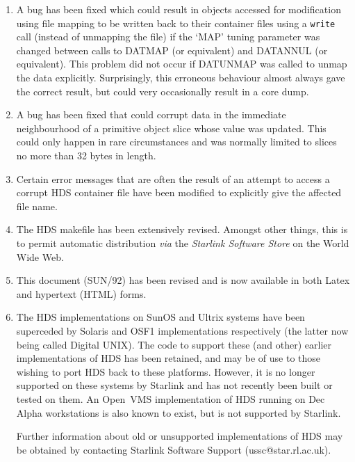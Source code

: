 \documentclass[twoside,11pt]{article}
\newcommand{\htmlref}[2]{#1}
\renewcommand{\_}{\texttt{\symbol{95}}}
\newcommand{\hi}[1]{{\tt{#1}}}
\newcommand{\st}[1]{{\em{#1}}}
\begin{document}
\begin{enumerate}
\item A bug has been fixed which could result in objects accessed for
modification using file mapping to be written back to their container
files using a \hi{write} call (instead of unmapping the file) if the
`MAP' tuning parameter was changed between calls to
\htmlref{DAT\_MAP}{DAT_MAP} (or equivalent) and
\htmlref{DAT\_ANNUL}{DAT_ANNUL} (or equivalent). This problem did not
occur if \htmlref{DAT\_UNMAP}{DAT_UNMAP} was called to unmap the data
explicitly. Surprisingly, this erroneous behaviour almost always gave
the correct result, but could very occasionally result in a core dump.

\item A bug has been fixed that could corrupt data in the immediate
neighbourhood of a primitive object slice whose value was
updated. This could only happen in rare circumstances and was normally
limited to slices no more than 32 bytes in length.

\item Certain error messages that are often the result of an attempt
to access a corrupt HDS container file have been modified to
explicitly give the affected file name.

\item The HDS makefile has been extensively revised. Amongst other
things, this is to permit automatic distribution \st{via} the
\st{Starlink Software Store} on the World Wide Web.

\item This document (SUN/92) has been revised and is now available in
both Latex and hypertext (HTML) forms.

\item The HDS implementations on SunOS and Ultrix systems have been
superceded by Solaris and OSF1 implementations respectively (the
latter now being called Digital UNIX). The code to support these (and
other) earlier implementations of HDS has been retained, and may be of
use to those wishing to port HDS back to these platforms. However, it
is no longer supported on these systems by Starlink and has not
recently been built or tested on them.  An Open~VMS implementation of
HDS running on Dec Alpha workstations is also known to exist, but is
not supported by Starlink.

Further information about old or unsupported implementations of HDS
may be obtained by contacting Starlink Software Support
(ussc@star.rl.ac.uk).

\end{enumerate}
\end{document}
